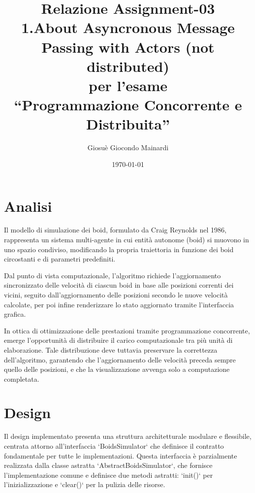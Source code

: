 \documentclass[a4paper,12pt]{report}
\title{Relazione Assignment-03 \\
1.About Asyncronous Message Passing with Actors (not distributed)\\ per l'esame \\ ``Programmazione Concorrente e Distribuita''}
\author{Giosuè Giocondo Mainardi}
\date{\today}
\begin{document}
\maketitle

\tableofcontents

\chapter{Analisi}
    Il modello di simulazione dei boid, formulato da Craig Reynolds nel 1986, rappresenta un sistema multi-agente in cui 
    entità autonome (boid) si muovono in uno spazio condiviso, modificando la propria traiettoria in funzione dei boid 
    circostanti e di parametri predefiniti.
    
    Dal punto di vista computazionale, l'algoritmo richiede l'aggiornamento sincronizzato delle velocità di ciascun boid 
    in base alle posizioni correnti dei vicini, seguito dall'aggiornamento delle posizioni secondo le nuove velocità 
    calcolate, per poi infine renderizzare lo stato aggiornato tramite l'interfaccia grafica.
    
    In ottica di ottimizzazione delle prestazioni tramite programmazione concorrente, emerge l'opportunità di distribuire 
    il carico computazionale tra più unità di elaborazione. Tale distribuzione deve tuttavia preservare la correttezza 
    dell'algoritmo, garantendo che l'aggiornamento delle velocità preceda sempre quello delle posizioni, e che la 
    visualizzazione avvenga solo a computazione completata.


\chapter{Design}

    Il design implementato presenta una struttura architetturale modulare e flessibile, centrata attorno all'interfaccia `BoidsSimulator` che definisce il contratto fondamentale per tutte le implementazioni. Questa interfaccia è parzialmente realizzata dalla classe astratta `AbstractBoidsSimulator`, che fornisce l'implementazione comune e definisce due metodi astratti: `init()` per l'inizializzazione e `clear()` per la pulizia delle risorse.
    
\end{document}
